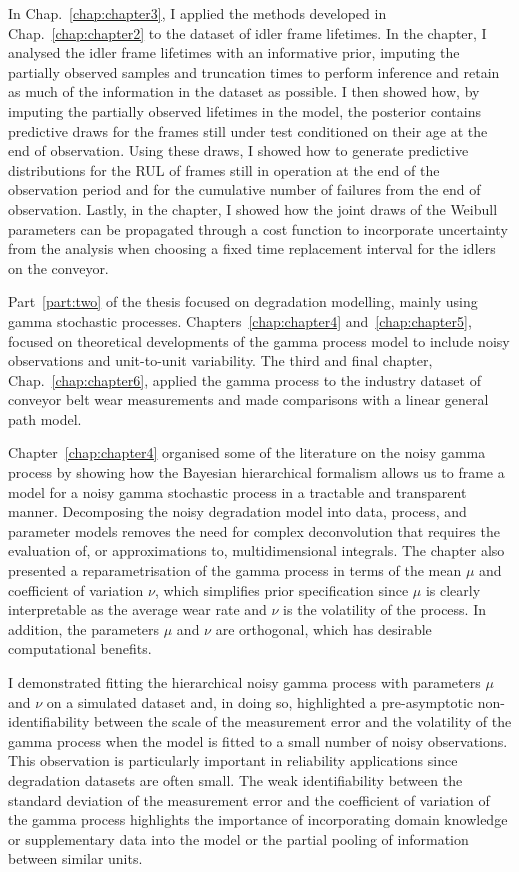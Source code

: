 In Chap.~\ref{chap:chapter3}, I applied the methods developed in Chap.~\ref{chap:chapter2} to the dataset of idler frame lifetimes. In the chapter, I analysed the idler frame lifetimes with an informative prior, imputing the partially observed samples and truncation times to perform inference and retain as much of the information in the dataset as possible. I then showed how, by imputing the partially observed lifetimes in the model, the posterior contains predictive draws for the frames still under test conditioned on their age at the end of observation. Using these draws, I showed how to generate predictive distributions for the RUL of frames still in operation at the end of the observation period and for the cumulative number of failures from the end of observation. Lastly, in the chapter, I showed how the joint draws of the Weibull parameters can be propagated through a cost function to incorporate uncertainty from the analysis when choosing a fixed time replacement interval for the idlers on the conveyor. 

Part~\ref{part:two} of the thesis focused on degradation modelling, mainly using gamma stochastic processes. Chapters~\ref{chap:chapter4} and~\ref{chap:chapter5}, focused on theoretical developments of the gamma process model to include noisy observations and unit-to-unit variability. The third and final chapter, Chap.~\ref{chap:chapter6}, applied the gamma process to the industry dataset of conveyor belt wear measurements and made comparisons with a linear general path model.

Chapter~\ref{chap:chapter4} organised some of the literature on the noisy gamma process by showing how the Bayesian hierarchical formalism allows us to frame a model for a noisy gamma stochastic process in a tractable and transparent manner. Decomposing the noisy degradation model into data, process, and parameter models removes the need for complex deconvolution that requires the evaluation of, or approximations to, multidimensional integrals. The chapter also presented a reparametrisation of the gamma process in terms of the mean $\mu$ and coefficient of variation $\nu$, which simplifies prior specification since $\mu$ is clearly interpretable as the average wear rate and $\nu$ is the volatility of the process. In addition, the parameters $\mu$ and $\nu$ are orthogonal, which has desirable computational benefits.

I demonstrated fitting the hierarchical noisy gamma process with parameters $\mu$ and $\nu$ on a simulated dataset and, in doing so, highlighted a pre-asymptotic non-identifiability between the scale of the measurement error and the volatility of the gamma process when the model is fitted to a small number of noisy observations. This observation is particularly important in reliability applications since degradation datasets are often small. The weak identifiability between the standard deviation of the measurement error and the coefficient of variation of the gamma process highlights the importance of incorporating domain knowledge or supplementary data into the model or the partial pooling of information between similar units.

